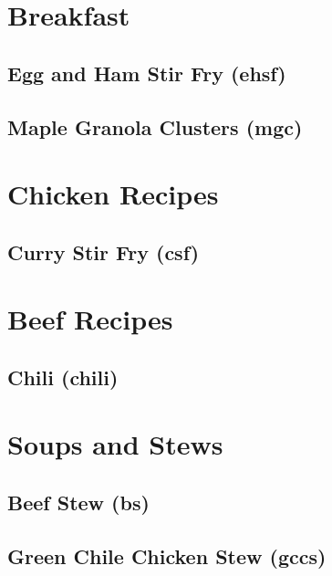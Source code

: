 \documentclass{report}
\begin{document}
\tableofcontents


\chapter{Breakfast}

\section{Egg and Ham Stir Fry (ehsf)}

\newpage

\section{Maple Granola Clusters (mgc)}


\chapter{Chicken Recipes}
\newpage
\section{Curry Stir Fry (csf)}

 
\chapter{Beef Recipes}
\newpage
\section{Chili (chili)}

\newpage



\chapter{Soups and Stews}
\newpage 

\section{Beef Stew (bs)}

\newpage 



\section{Green Chile Chicken Stew (gccs)}

\end{document}
